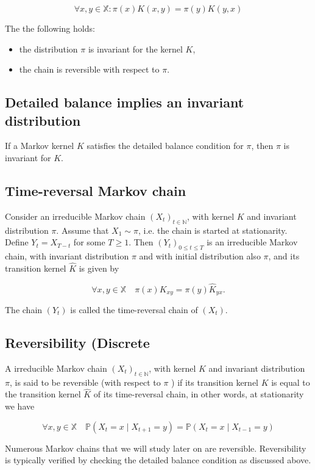 \documentclass[10pt]{article}
\begin{document}
$$
\forall x, y \in \mathbb{X}: \pi(x) K(x, y)=\pi(y) K(y, x)
$$

The the following holds:

\begin{itemize}
  \item the distribution $\pi$ is invariant for the kernel $K$,
  \item the chain is reversible with respect to $\pi$.
\end{itemize}

\subsection{Detailed balance implies an invariant distribution}
If a Markov kernel $K$ satisfies the detailed balance condition for $\pi$, then $\pi$ is invariant for $K$.

\subsection{Time-reversal Markov chain}
Consider an irreducible Markov chain $\left(X_{t}\right)_{t \in \mathbb{N}}$, with kernel $K$ and invariant distribution $\pi$. Assume that $X_{1} \sim \pi$, i.e. the chain is started at stationarity. Define $Y_{t}=X_{T-t}$ for some $T \geq 1$. Then $\left(Y_{t}\right)_{0 \leq t \leq T}$ is an irreducible Markov chain, with invariant distribution $\pi$ and with initial distribution also $\pi$, and its transition kernel $\hat{K}$ is given by

$$
\forall x, y \in \mathbb{X} \quad \pi(x) K_{x y}=\pi(y) \hat{K}_{y x} .
$$

The chain $\left(Y_{t}\right)$ is called the time-reversal chain of $\left(X_{t}\right)$.

\subsection{Reversibility (Discrete}
A irreducible Markov chain $\left(X_{t}\right)_{t \in \mathbb{N}}$, with kernel $K$ and invariant distribution $\pi$, is said to be reversible (with respect to $\pi$ ) if its transition kernel $K$ is equal to the transition kernel $\hat{K}$ of its time-reversal chain, in other words, at stationarity we have

$$
\forall x, y \in \mathbb{X} \quad \mathbb{P}\left(X_{t}=x \mid X_{t+1}=y\right)=\mathbb{P}\left(X_{t}=x \mid X_{t-1}=y\right)
$$

Numerous Markov chains that we will study later on are reversible. Reversibility is typically verified by checking the detailed balance condition as discussed above.
\end{document}
